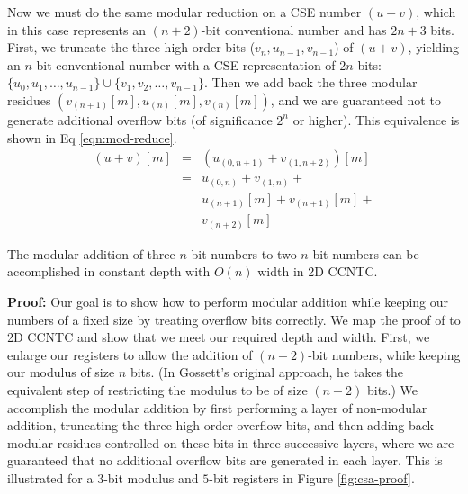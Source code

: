 \documentclass[twoside]{article}
\begin{document}
Now we must do the same modular reduction on a CSE number $(u+v)$,
which in this case represents an $(n+2)$-bit conventional number and has
$2n+3$ bits.
%
%
First, we truncate the three high-order bits ($v_{n}, u_{n-1}, v_{n-1}$)
of $(u+v)$, yielding an $n$-bit
conventional number with a CSE representation of $2n$ bits:
$\{u_0, u_1, \ldots, u_{n-1}\} \cup \{v_1, v_2, \ldots, v_{n-1}\}$.
Then we add back the three modular residues
$(v_{(n+1)}[m], u_{(n)}[m], v_{(n)}[m])$, and we are guaranteed not to
generate additional overflow bits (of significance $2^{n}$ or higher). This equivalence
is shown in Eq \ref{eqn:mod-reduce}.
\begin{eqnarray}
(u+v)[m] &=& \left(u_{(0,n+1)} + v_{(1,n+2)}\right)[m] \nonumber \\
 &=& u_{(0,n)} +
     v_{(1,n)} + \nonumber \\
 & & u_{(n+1)}[m] +
     v_{(n+1)}[m] + \nonumber \\
 & & v_{(n+2)}[m]
\label{eqn:mod-reduce}
\end{eqnarray}

\begin{lemma}
The modular addition of three $n$-bit numbers to two $n$-bit numbers can be
accomplished
in constant depth with $O(n)$ width in \textsc{2D CCNTC}.
\end{lemma}

\vspace*{12pt}
\noindent
{\bf Proof:}
Our goal is to show how to perform modular addition while keeping our numbers
of a fixed size by treating overflow bits correctly.
We map the proof of \cite{Gossett1998} to \textsc{2D CCNTC} and show that
we meet our required depth and width.
First, we enlarge our registers to allow the addition of $(n+2)$-bit numbers,
while keeping our modulus of size $n$ bits.
(In Gossett's original approach, he takes the equivalent step of restricting
the modulus to be of size $(n-2)$ bits.) We accomplish the modular addition
by first performing a layer of non-modular addition, truncating the three high-order
overflow bits, and then adding back modular residues controlled on these
bits in three successive layers, where we are guaranteed that no additional
overflow bits are generated in each layer.
This is illustrated for a $3$-bit modulus and $5$-bit registers
in Figure \ref{fig:csa-proof}.
\end{document}
